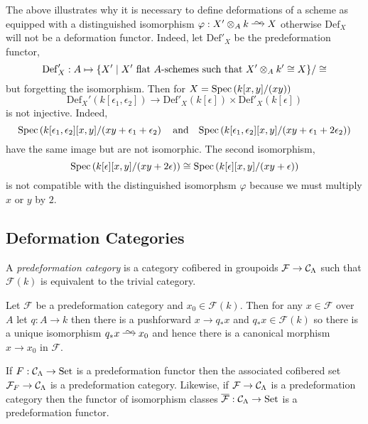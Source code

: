 \documentclass[12pt]{article}
\newcommand{\Set}{\mathrm{Set}}
\newcommand{\Def}{\mathrm{Def}}
\renewcommand{\F}{\mathcal{F}}
\begin{document}
\begin{rmk}
The above illustrates why it is necessary to define deformations of a scheme as equipped with a distinguished isomorphism $\varphi : X' \ot_A k \iso X$ otherwise $\Def_X$ will not be a deformation functor. Indeed, let $\Def'_X$ be the predeformation functor,
\[ \Def'_X : A \mapsto \{ X' \mid X' \text{ flat } A\text{-schemes such that } X' \ot_A k' \cong X \} / \cong \]
but forgetting the isomorphism. Then for $X = \mathrm{Spec}\left( k[x,y]/(xy) \right)$
\[ \Def_X'(k[\epsilon_1, \epsilon_2]) \to \Def'_X(k[\epsilon]) \times \Def'_X(k[\epsilon]) \]
is not injective. Indeed,  
\[ \mathrm{Spec}\left( k[\epsilon_1, \epsilon_2][x,y]/(xy + \epsilon_1 + \epsilon_2 \right) \quad \text{and} \quad \mathrm{Spec}\left( k[\epsilon_1, \epsilon_2][x,y]/(xy + \epsilon_1 + 2 \epsilon_2) \right) \]  
have the same image but are not isomorphic. The second isomorphism,
\[ \mathrm{Spec}\left( k[\epsilon][x,y]/(xy + 2 \epsilon) \right) \cong \mathrm{Spec}\left( k[\epsilon][x,y]/(xy + \epsilon) \right) \]
is not compatible with the distinguished isomorphsm $\varphi$ because we must multiply $x$ or $y$ by $2$.
\end{rmk}


\subsection{Deformation Categories}

\begin{defn}
A \textit{predeformation category} is a category cofibered in groupoids $\F \to \C_{\Lambda}$ such that $\F(k)$ is equivalent to the trivial category. 
\end{defn}

\begin{rmk}
Let $\F$ be a predeformation category and $x_0 \in \F(k)$. Then for any $x \in \F$ over $A$ let $q : A \to k$ then there is a pushforward $x \to q_* x$ and $q_* x \in \F(k)$ so there is a unique isomorphism $q_* x \iso x_0$ and hence there is a canonical morphism $x \to x_0$ in $\F$. 
\end{rmk}

\begin{rmk}
If $F : \C_\Lambda \to \Set$ is a predeformation functor then the associated cofibered set $\F_F \to \C_{\Lambda}$ is a predeformation category. Likewise, if $\F \to \C_\Lambda$ is a predeformation category then the functor of isomorphism classes $\overline{\F} : \C_{\Lambda} \to \Set$ is a predeformation functor. 
\end{rmk}
\end{document}
